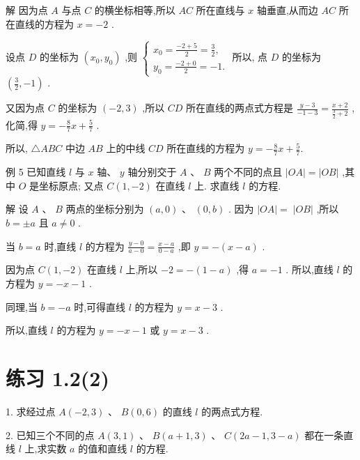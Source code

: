 \documentclass[10pt]{article}
\begin{document}
解 因为点 \(A\) 与点 \(C\) 的横坐标相等,所以 \({AC}\) 所在直线与 \(x\) 轴垂直,从而边 \({AC}\) 所在直线的方程为 \(x =  - 2\) .

设点 \(D\) 的坐标为 \(\left( {{x}_{0},{y}_{0}}\right)\) ,则 \(\left\{  \begin{array}{l} {x}_{0} = \frac{-2 + 5}{2} = \frac{3}{2}, \\  {y}_{0} = \frac{-2 + 0}{2} =  - 1. \end{array}\right.\) 所以, 点 \(D\) 的坐标为 \(\left( {\frac{3}{2}, - 1}\right)\) .

又因为点 \(C\) 的坐标为 \(\left( {-2,3}\right)\) ,所以 \({CD}\) 所在直线的两点式方程是 \(\frac{y - 3}{-1 - 3} = \frac{x + 2}{\frac{3}{2} + 2}\) ,化简,得 \(y =  - \frac{8}{7}x + \frac{5}{7}\) .

所以, \(\bigtriangleup {ABC}\) 中边 \({AB}\) 上的中线 \({CD}\) 所在直线的方程为 \(y =  - \frac{8}{7}x + \frac{5}{7}.\)

例 5 已知直线 \(l\) 与 \(x\) 轴、 \(y\) 轴分别交于 \(A\) 、 \(B\) 两个不同的点且 \(\left| {OA}\right|  = \left| {OB}\right|\) ,其中 \(O\) 是坐标原点; 又点 \(C\left( {1, - 2}\right)\) 在直线 \(l\) 上. 求直线 \(l\) 的方程.

解 设 \(A\text{ 、 }B\) 两点的坐标分别为 \(\left( {a,0}\right) \text{ 、 }\left( {0,b}\right)\) . 因为 \(\left| {OA}\right|  = \; \left| {OB}\right|\) ,所以 \(b =  \pm  a\) 且 \(a \neq  0\) .

当 \(b = a\) 时,直线 \(l\) 的方程为 \(\frac{y - 0}{a - 0} = \frac{x - a}{0 - a}\) ,即 \(y =  - \left( {x - a}\right)\) .

因为点 \(C\left( {1, - 2}\right)\) 在直线 \(l\) 上,所以 \(- 2 =  - \left( {1 - a}\right)\) ,得 \(a =  - 1\) . 所以,直线 \(l\) 的方程为 \(y =  - x - 1\) .

同理,当 \(b =  - a\) 时,可得直线 \(l\) 的方程为 \(y = x - 3\) .

所以,直线 \(l\) 的方程为 \(y =  - x - 1\) 或 \(y = x - 3\) .

\section*{练习 1.2(2)}

1. 求经过点 \(A\left( {-2,3}\right) \text{ 、 }B\left( {0,6}\right)\) 的直线 \(l\) 的两点式方程.

2. 已知三个不同的点 \(A\left( {3,1}\right) \text{ 、 }B\left( {a + 1,3}\right) \text{ 、 }C\left( {{2a} - 1,3 - a}\right)\) 都在一条直线 \(l\) 上,求实数 \(a\) 的值和直线 \(l\) 的方程.
\end{document}
